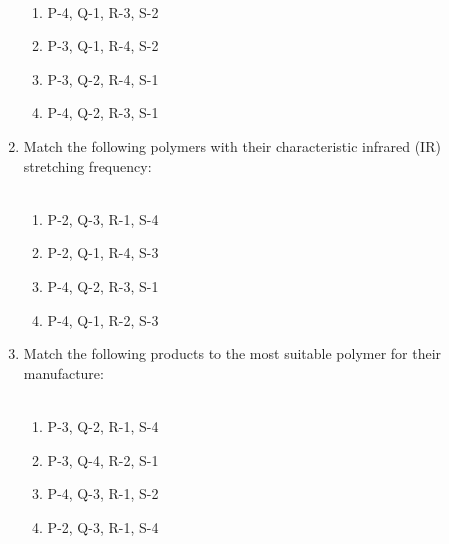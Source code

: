 \documentclass[journal,12pt,onecolumn]{IEEEtran}
\begin{document}
\begin{enumerate}[label=\arabic*)]


\hfill{} \\

\vspace{0.2cm}
\begin{enumerate}[label=\alph*)]
\item P-4, Q-1, R-3, S-2
\item P-3, Q-1, R-4, S-2
\item P-3, Q-2, R-4, S-1
\item P-4, Q-2, R-3, S-1
\end{enumerate}

\newpage

\item Match the following polymers with their characteristic infrared (IR) stretching frequency:\\



\hfill{} \\
\vspace{0.2cm}
\begin{enumerate}[label=\alph*)]
\item P-2, Q-3, R-1, S-4
\item P-2, Q-1, R-4, S-3
\item P-4, Q-2, R-3, S-1
\item P-4, Q-1, R-2, S-3
\end{enumerate}

\vspace{0.5cm}

\item Match the following products to the most suitable polymer for their manufacture:\\



\hfill{} \\

\vspace{0.2cm}
\begin{enumerate}[label=\alph*)]
\item P-3, Q-2, R-1, S-4
\item P-3, Q-4, R-2, S-1
\item P-4, Q-3, R-1, S-2
\item P-2, Q-3, R-1, S-4
\end{enumerate}

\vspace{0.5cm}


\end{enumerate}
\end{document}
